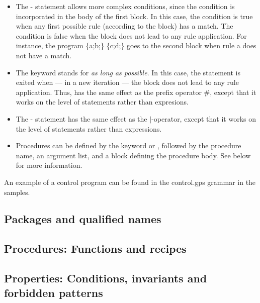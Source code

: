 \begin{itemize}
\item The \tryK-\elseK{} statement allows more complex conditions, since the
  condition is incorporated in the body of the first block. In this case, the
  condition is true when any first possible rule (according to the block) has a
  match. The condition is false when the block does not lead to any rule
  application.  For instance, the program \textsf{\tryK{} \{a;b;\}
  \elseK{} \{c;d;\}} goes to the second block when rule \textsf{a}
  does not have a match.

\item The \alapK{} keyword stands for \emph{as long as possible}. In this case,
  the statement is exited when --- in a new iteration --- the block does not
  lead to any rule application. Thus, \alapK{} has the same effect as the
  prefix operator \textsf{\#}, except that it works on the level of statements
  rather than expresions.

\item The \choiceK-\doK{} statement has the same effect as the
  \textsf{$|$}-operator, except that it works on the level of statements rather
  than expressions.

\item Procedures can be defined by the keyword \functionK or \recipeK,
  followed by the procedure name, an argument list, and a block defining the
  procedure body. See  below for more information.
\end{itemize}

An example of a control program can be found in the \textsf{control.gps}
grammar in the \GROOVE samples.

\subsection{Packages and qualified names}

\subsection{Procedures: Functions and recipes}

\subsection{Properties: Conditions, invariants and forbidden patterns}



